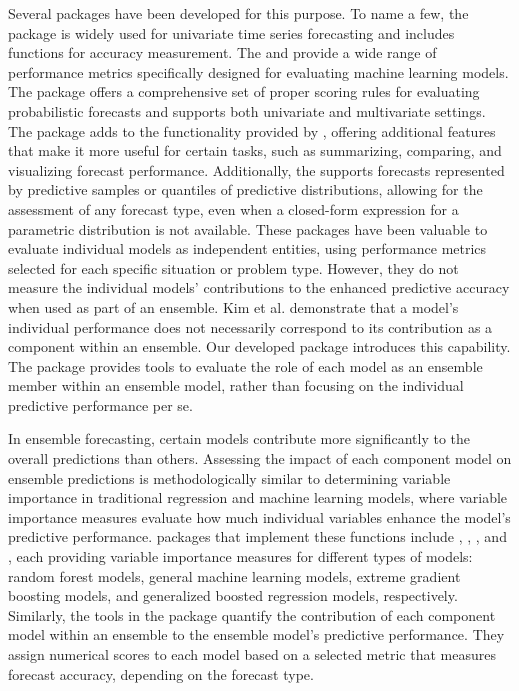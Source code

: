 \documentclass[
  article,
  shortnames,
  notitle]{jss}
\begin{document}
Several  packages have been developed for this purpose. To
name a few, the  package \citep{Rpackage-forecast} is
widely used for univariate time series forecasting and includes
functions for accuracy measurement. The 
\citep{Rpackage-Metrics} and  \citep{Rpackage-MLmetrics}
provide a wide range of performance metrics specifically designed for
evaluating machine learning models. The 
\citep{Rpackage-scoringRules} package offers a comprehensive set of
proper scoring rules for evaluating probabilistic forecasts and supports
both univariate and multivariate settings. The 
\citep{bosse2022evaluating} package adds to the functionality provided
by , offering additional features that make it more
useful for certain tasks, such as summarizing, comparing, and
visualizing forecast performance. Additionally, the 
supports forecasts represented by predictive samples or quantiles of
predictive distributions, allowing for the assessment of any forecast
type, even when a closed-form expression for a parametric distribution
is not available. These packages have been valuable to evaluate
individual models as independent entities, using performance metrics
selected for each specific situation or problem type. However, they do
not measure the individual models' contributions to the enhanced
predictive accuracy when used as part of an ensemble. Kim et al.
\citep{kim2024} demonstrate that a model's individual performance does
not necessarily correspond to its contribution as a component within an
ensemble. Our developed package introduces this capability. The
 package provides tools to evaluate the role of
each model as an ensemble member within an ensemble model, rather than
focusing on the individual predictive performance per se.

In ensemble forecasting, certain models contribute more significantly to
the overall predictions than others. Assessing the impact of each
component model on ensemble predictions is methodologically similar to
determining variable importance in traditional regression and machine
learning models, where variable importance measures evaluate how much
individual variables enhance the model's predictive performance.
 packages that implement these functions include
 \citep{Rpackage-randomForest}, 
\citep{Rpackage-caret},  \citep{Rpackage-xgboost}, and
 \citep{Rpackage-gbm}, each providing variable importance
measures for different types of models: random forest models, general
machine learning models, extreme gradient boosting models, and
generalized boosted regression models, respectively. Similarly, the
tools in the  package quantify the contribution of
each component model within an ensemble to the ensemble model's
predictive performance. They assign numerical scores to each model based
on a selected metric that measures forecast accuracy, depending on the
forecast type.
\end{document}
